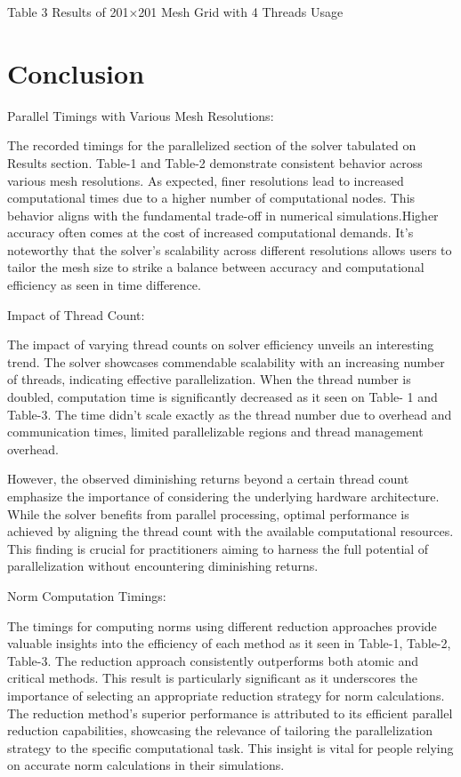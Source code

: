 \documentclass[10pt]{article}
\begin{document}
Table 3 Results of 201×201 Mesh Grid with 4 Threads Usage

\section{Conclusion}
Parallel Timings with Various Mesh Resolutions:

The recorded timings for the parallelized section of the solver tabulated on Results section. Table-1 and Table-2 demonstrate consistent behavior across various mesh resolutions. As expected, finer resolutions lead to increased computational times due to a higher number of computational nodes. This behavior aligns with the fundamental trade-off in numerical simulations.Higher accuracy often comes at the cost of increased computational demands. It's noteworthy that the solver's scalability across different resolutions allows users to tailor the mesh size to strike a balance between accuracy and computational efficiency as seen in time difference.

Impact of Thread Count:

The impact of varying thread counts on solver efficiency unveils an interesting trend. The solver showcases commendable scalability with an increasing number of threads, indicating effective parallelization. When the thread number is doubled, computation time is significantly decreased as it seen on Table- 1 and Table-3. The time didn't scale exactly as the thread number due to overhead and communication times, limited parallelizable regions and thread management overhead.

However, the observed diminishing returns beyond a certain thread count emphasize the importance of considering the underlying hardware architecture. While the solver benefits from parallel processing, optimal performance is achieved by aligning the thread count with the available computational resources. This finding is crucial for practitioners aiming to harness the full potential of parallelization without encountering diminishing returns.

Norm Computation Timings:

The timings for computing norms using different reduction approaches provide valuable insights into the efficiency of each method as it seen in Table-1, Table-2, Table-3. The reduction approach consistently outperforms both atomic and critical methods. This result is particularly significant as it underscores the importance of selecting an appropriate reduction strategy for norm calculations. The reduction method's superior performance is attributed to its efficient parallel reduction capabilities, showcasing the relevance of tailoring the parallelization strategy to the specific computational task. This insight is vital for people relying on accurate norm calculations in their simulations.
\end{document}
